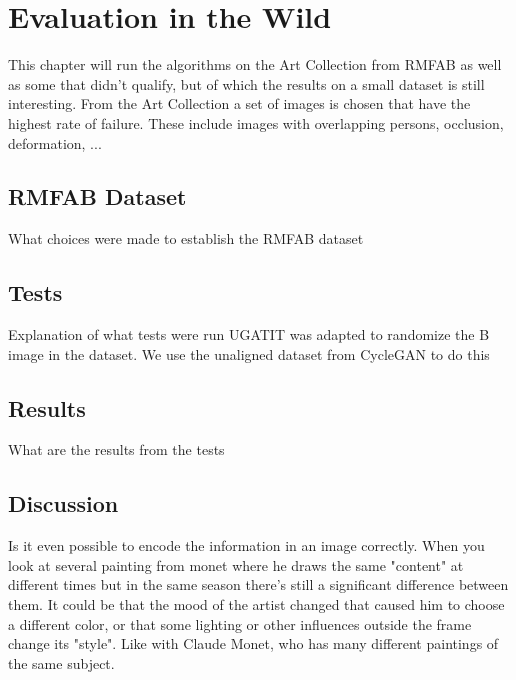 \chapter{Evaluation in the Wild}
This chapter will run the algorithms on the Art Collection from \gls{RMFAB}
as well as some that didn't qualify, but of which the results on a small dataset is still interesting.
From the Art Collection a set of images is chosen that have the highest rate of failure.
These include images with overlapping persons, occlusion, deformation, ...

\section{RMFAB Dataset}
What choices were made to establish the RMFAB dataset

\section{Tests}

Explanation of what tests were run
UGATIT was adapted to randomize the B image in the dataset.
We use the unaligned dataset from CycleGAN to do this

\section{Results}
What are the results from the tests

\section{Discussion}
Is it even possible to encode the information in an image correctly.
When you look at several painting from monet where he draws the same "content" at different times but in the same season there's still a significant difference between them.
It could be that the mood of the artist changed that caused him to choose a different color, or that some lighting or other influences outside the frame change its "style".
Like with Claude Monet, who has many different paintings of the same subject.

